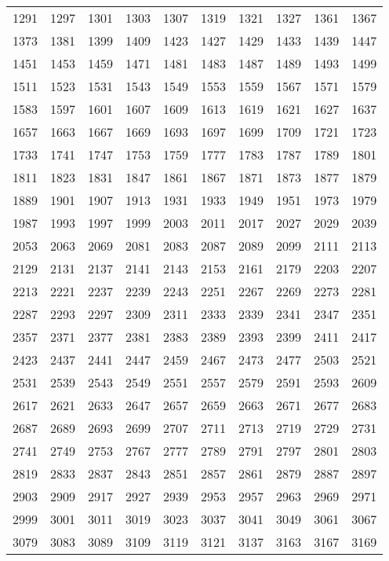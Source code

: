 \begin{longtable}{llllllllll}
1291	&	1297	&	1301	&	1303	&	1307	&	1319	&	1321	&	1327	&	1361	&	1367	\\
1373	&	1381	&	1399	&	1409	&	1423	&	1427	&	1429	&	1433	&	1439	&	1447	\\
1451	&	1453	&	1459	&	1471	&	1481	&	1483	&	1487	&	1489	&	1493	&	1499	\\
1511	&	1523	&	1531	&	1543	&	1549	&	1553	&	1559	&	1567	&	1571	&	1579	\\
1583	&	1597	&	1601	&	1607	&	1609	&	1613	&	1619	&	1621	&	1627	&	1637	\\
1657	&	1663	&	1667	&	1669	&	1693	&	1697	&	1699	&	1709	&	1721	&	1723	\\
1733	&	1741	&	1747	&	1753	&	1759	&	1777	&	1783	&	1787	&	1789	&	1801	\\
1811	&	1823	&	1831	&	1847	&	1861	&	1867	&	1871	&	1873	&	1877	&	1879	\\
1889	&	1901	&	1907	&	1913	&	1931	&	1933	&	1949	&	1951	&	1973	&	1979	\\
1987	&	1993	&	1997	&	1999	&	2003	&	2011	&	2017	&	2027	&	2029	&	2039	\\
2053	&	2063	&	2069	&	2081	&	2083	&	2087	&	2089	&	2099	&	2111	&	2113	\\
2129	&	2131	&	2137	&	2141	&	2143	&	2153	&	2161	&	2179	&	2203	&	2207	\\
2213	&	2221	&	2237	&	2239	&	2243	&	2251	&	2267	&	2269	&	2273	&	2281	\\
2287	&	2293	&	2297	&	2309	&	2311	&	2333	&	2339	&	2341	&	2347	&	2351	\\
2357	&	2371	&	2377	&	2381	&	2383	&	2389	&	2393	&	2399	&	2411	&	2417	\\
2423	&	2437	&	2441	&	2447	&	2459	&	2467	&	2473	&	2477	&	2503	&	2521	\\
2531	&	2539	&	2543	&	2549	&	2551	&	2557	&	2579	&	2591	&	2593	&	2609	\\
2617	&	2621	&	2633	&	2647	&	2657	&	2659	&	2663	&	2671	&	2677	&	2683	\\
2687	&	2689	&	2693	&	2699	&	2707	&	2711	&	2713	&	2719	&	2729	&	2731	\\
2741	&	2749	&	2753	&	2767	&	2777	&	2789	&	2791	&	2797	&	2801	&	2803	\\
2819	&	2833	&	2837	&	2843	&	2851	&	2857	&	2861	&	2879	&	2887	&	2897	\\
2903	&	2909	&	2917	&	2927	&	2939	&	2953	&	2957	&	2963	&	2969	&	2971	\\
2999	&	3001	&	3011	&	3019	&	3023	&	3037	&	3041	&	3049	&	3061	&	3067	\\
3079	&	3083	&	3089	&	3109	&	3119	&	3121	&	3137	&	3163	&	3167	&	3169	\\

\end{longtable}
